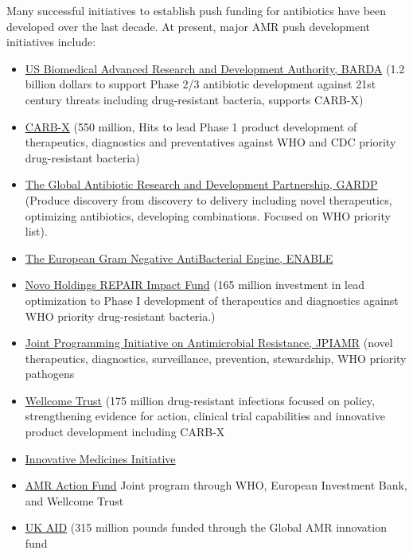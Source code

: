 \documentclass[
  11pt,
  paper=a4,
  ,captions=tableheading
]{scrartcl}
\begin{document}
Many successful initiatives to establish push funding for antibiotics
have been developed over the last decade. At present, major AMR push
development initiatives include:

\begin{itemize}
\item
  \href{https://www.phe.gov/about/barda/Pages/default.aspx}{US
  Biomedical Advanced Research and Development Authority, BARDA} (1.2
  billion dollars to support Phase 2/3 antibiotic development against
  21st century threats including drug-resistant bacteria, supports
  CARB-X)
\item
  \href{https://carb-x.org/}{CARB-X} (550 million, Hits to lead Phase 1
  product development of therapeutics, diagnostics and preventatives
  against WHO and CDC priority drug-resistant bacteria)
\item
  \href{https://www.gardp.org/}{The Global Antibiotic Research and
  Development Partnership, GARDP} (Produce discovery from discovery to
  delivery including novel therapeutics, optimizing antibiotics,
  developing combinations. Focused on WHO priority list).
\item
  \href{https://www.imi.europa.eu/projects-results/project-factsheets/enable}{The
  European Gram Negative AntiBacterial Engine, ENABLE}
\item
  \href{https://www.repair-impact-fund.com/}{Novo Holdings REPAIR Impact
  Fund} (165 million investment in lead optimization to Phase I
  development of therapeutics and diagnostics against WHO priority
  drug-resistant bacteria.)
\item
  \href{https://www.jpiamr.eu}{Joint Programming Initiative on
  Antimicrobial Resistance, JPIAMR} (novel therapeutics, diagnostics,
  surveillance, prevention, stewardship, WHO priority pathogens
\item
  \href{https://wellcome.org/}{Wellcome Trust} (175 million
  drug-resistant infections focused on policy, strengthening evidence
  for action, clinical trial capabilities and innovative product
  development including CARB-X
\item
  \href{https://www.imi.europa.eu/}{Innovative Medicines Initiative}
\item
  \href{https://www.amractionfund.com/}{AMR Action Fund} Joint program
  through WHO, European Investment Bank, and Wellcome Trust
\item
  \href{https://www.gov.uk/government/groups/the-global-amr-innovation-fund}{UK
  AID} (315 million pounds funded through the Global AMR innovation fund

\end{itemize}
\end{document}

